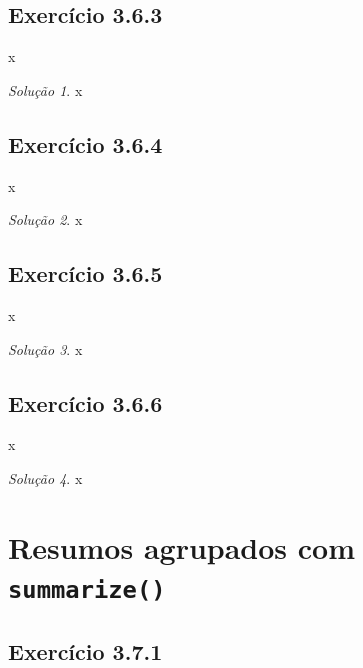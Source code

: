 \documentclass[
]{latex/krantz}
\theoremstyle{definition}
\theoremstyle{definition}
\theoremstyle{definition}
\theoremstyle{definition}
\theoremstyle{remark}
\newtheorem*{solution}{Solução}
\begin{document}
\hypertarget{exr3-6-3}{%
\subsection*{Exercício 3.6.3}\label{exr3-6-3}}

x

\begin{solution}
x
\end{solution}

\hypertarget{exr3-6-4}{%
\subsection*{Exercício 3.6.4}\label{exr3-6-4}}

x

\begin{solution}
x
\end{solution}

\hypertarget{exr3-6-5}{%
\subsection*{Exercício 3.6.5}\label{exr3-6-5}}

x

\begin{solution}
x
\end{solution}

\hypertarget{exr3-6-6}{%
\subsection*{Exercício 3.6.6}\label{exr3-6-6}}

x

\begin{solution}
x
\end{solution}

\hypertarget{resumos-agrupados-com-summarize}{%
\section{\texorpdfstring{Resumos agrupados com \texttt{summarize()}}{Resumos agrupados com summarize()}}\label{resumos-agrupados-com-summarize}}

\hypertarget{exr3-7-1}{%
\subsection*{Exercício 3.7.1}\label{exr3-7-1}}
\end{document}
